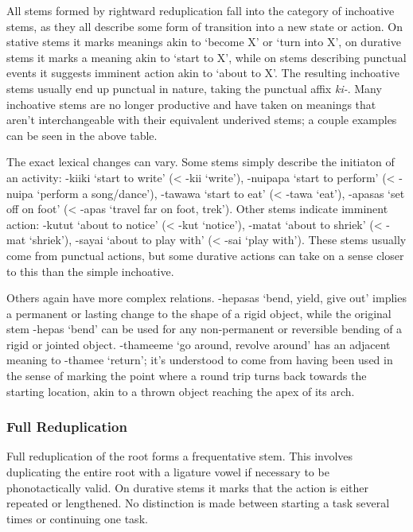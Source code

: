 \documentclass[executivepaper,10pt,twoside,openany,draft]{memoir}
\begin{document}
All stems formed by rightward reduplication fall into the category of inchoative stems, as they all describe some form of transition into a new state or action. On stative stems it marks meanings akin to `become X' or `turn into X', on durative stems it marks a meaning akin to `start to X', while on stems describing punctual events it suggests imminent action akin to `about to X'. The resulting inchoative stems usually end up punctual in nature, taking the punctual affix \textit{ki-}. Many inchoative stems are no longer productive and have taken on meanings that aren't interchangeable with their equivalent underived stems; a couple examples can be seen in the above table.

The exact lexical changes can vary. Some stems simply describe the initiaton of an activity: -kiiki `start to write' (< -kii `write'), -nuipapa `start to perform' (< -nuipa `perform a song/dance'), -tawawa `start to eat' (< -tawa `eat'), -apasas `set off on foot' (< -apas `travel far on foot, trek'). Other stems indicate imminent action: -kutut `about to notice' (< -kut `notice'), -matat `about to shriek' (< -mat `shriek'), -sayai `about to play with' (< -sai `play with'). These stems usually come from punctual actions, but some durative actions can take on a sense closer to this than the simple inchoative.

Others again have more complex relations. -hepasas `bend, yield, give out' implies a permanent or lasting change to the shape of a rigid object, while the original stem -hepas `bend' can be used for any non-permanent or reversible bending of a rigid or jointed object. -thameeme `go around, revolve around' has an adjacent meaning to -thamee `return'; it's understood to come from having been used in the sense of marking the point where a round trip turns back towards the starting location, akin to a thrown object reaching the apex of its arch.

\subsubsection{Full Reduplication}

Full reduplication of the root forms a frequentative stem. This involves duplicating the entire root with a ligature vowel if necessary to be phonotactically valid. On durative stems it marks that the action is either repeated or lengthened. No distinction is made between starting a task several times or continuing one task.

\end{document}
